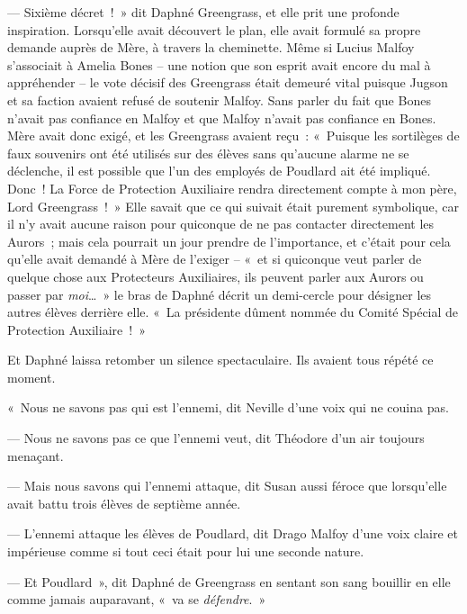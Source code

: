 --- Sixième décret~!~»
dit Daphné Greengrass, et elle prit une profonde inspiration.
Lorsqu'elle avait découvert le plan, elle avait formulé sa propre demande auprès de Mère, à travers la cheminette.
Même si Lucius Malfoy s'associait à Amelia Bones -- une notion que son esprit avait encore du mal à appréhender -- le vote décisif des Greengrass était demeuré vital puisque Jugson et sa faction avaient refusé de soutenir Malfoy.
Sans parler du fait que Bones n'avait pas confiance en Malfoy et que Malfoy n'avait pas confiance en Bones.
Mère avait donc exigé, et les Greengrass avaient reçu~: «~Puisque les sortilèges de faux souvenirs ont été utilisés sur des élèves sans qu'aucune alarme ne se déclenche, il est possible que l'un des employés de Poudlard ait été impliqué.
Donc~! La Force de Protection Auxiliaire rendra directement compte à mon père, Lord Greengrass~!~»
Elle savait que ce qui suivait était purement symbolique, car il n'y avait aucune raison pour quiconque de ne pas contacter directement les Aurors~; mais cela pourrait un jour prendre de l'importance, et c'était pour cela qu'elle avait demandé à Mère de l'exiger -- «~et si quiconque veut parler de quelque chose aux Protecteurs Auxiliaires, ils peuvent parler aux Aurors ou passer par \emph{moi}…~»
le bras de Daphné décrit un demi-cercle pour désigner les autres élèves derrière elle.
«~La présidente dûment nommée du Comité Spécial de Protection Auxiliaire~!~»

Et Daphné laissa retomber un silence spectaculaire.
Ils avaient tous répété ce moment.

«~Nous ne savons pas qui est l'ennemi, dit Neville d'une voix qui ne couina pas.

--- Nous ne savons pas ce que l'ennemi veut, dit Théodore d'un air toujours menaçant.

--- Mais nous savons qui l'ennemi attaque, dit Susan aussi féroce que lorsqu'elle avait battu trois élèves de septième année.

--- L'ennemi attaque les élèves de Poudlard, dit Drago Malfoy d'une voix claire et impérieuse comme si tout ceci était pour lui une seconde nature.

--- Et Poudlard~», dit Daphné de Greengrass en sentant son sang bouillir en elle comme jamais auparavant, «~va se \emph{défendre}.~»
